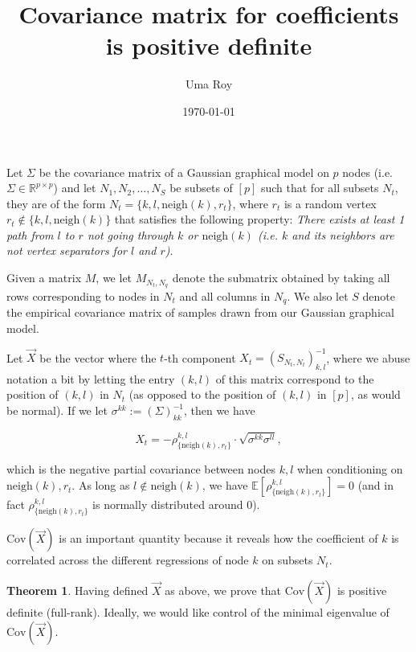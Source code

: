 \documentclass{article}
\title{Covariance matrix for coefficients is positive definite}
\author{Uma Roy}
\date{\today}
\theoremstyle{definition}
\newtheorem{theorem}{Theorem}
\newcommand{\Cov}{\mathrm{Cov}}
\newcommand{\E}{\mathbb{E}}
\newcommand{\X}{\vec{X}}
\newcommand{\neigh}[1]{\text{neigh}(#1)}
\begin{document}
\maketitle

Let $\Sigma$ be the covariance matrix of a Gaussian graphical model on $p$ nodes (i.e. $\Sigma \in \mathbb{R}^{p \times p}$) and let $N_1, N_2, \ldots, N_S$ be subsets of $[p]$ such that for all subsets $N_t$, they are of the form $N_t = \{ k, l, \neigh{k}, r_t \}$, where $r_t$ is a random vertex $r_t \not \in \{ k, l, \neigh{k} \}$ that satisfies the following property: \emph{There exists at least 1 path from $l$ to $r$ not going through $k$ or $\neigh{k}$ (i.e. $k$ and its neighbors are not vertex separators for $l$ and $r$)}.

Given a matrix $M$, we let $M_{N_t, N_q}$ denote the submatrix obtained by taking all rows corresponding to nodes in $N_t$ and all columns in $N_q$. We also let $S$ denote the empirical covariance matrix of samples drawn from our Gaussian graphical model. 

Let $\X$ be the vector where the $t$-th component $X_t = (S_{N_t, N_t})^{-1}_{k,l}$, where we abuse notation a bit by letting the entry $(k,l)$ of this matrix correspond to the position of $(k,l)$ in $N_t$ (as opposed to the position of $(k,l)$ in $[p]$, as would be normal). If we let $\sigma^{kk} := (\Sigma)^{-1}_{kk}$, then we have 

$$X_t = -\rho^{k,l}_{ \{ \neigh{k}, r_t \}} \cdot \sqrt{\sigma^{kk} \sigma^{ll}},$$ 

which is the negative partial covariance between nodes $k, l$ when conditioning on $\neigh{k}, r_t$. As long as $l \not \in \neigh{k}$, we have $\E[\rho^{k,l}_{ \{ \neigh{k}, r_t \}}] = 0$ (and in fact $\rho^{k,l}_{ \{ \neigh{k}, r_t \}}$ is normally distributed around $0$). 

$\Cov(\X)$ is an important quantity because it reveals how the coefficient of $k$ is correlated across the different regressions of node $k$ on subsets $N_t$. 
\begin{theorem}

Having defined $\X$ as above, we prove that $\Cov(\X)$ is positive definite (full-rank). Ideally, we would like control of the minimal eigenvalue of $\Cov(\X)$.

\end{theorem}
\end{document}
